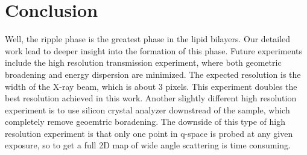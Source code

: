 \section{Conclusion}
Well, the ripple phase is the greatest phase in the lipid bilayers. Our detailed
work lead to deeper insight into the formation of this phase. Future experiments
include the high resolution transmission experiment, where both geometric 
broadening and energy dispersion are minimized. The expected resolution 
is the width of the X-ray beam, which is about 3 pixels. This experiment 
doubles the best resolution achieved in this work. 
Another slightly different high resolution experiment is to use silicon 
crystal analyzer downstread of the sample, which completely remove geoemtric
boradening. The downside of this type of high resolution experiment is that
only one point in q-space is probed at any given exposure, so to get a full
2D map of wide angle scattering is time consuming.  
